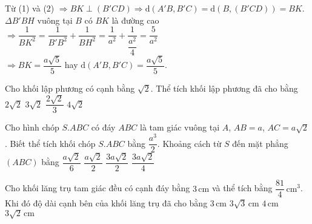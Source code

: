 \begin{ex}
{{}
			\noindent Từ (1) và (2) $\Rightarrow BK\perp \left( B'CD \right)\Rightarrow \mathrm{d} \left( A'B,B'C \right)=\mathrm{d} \left( B,\left( B'CD \right) \right)=BK$.\\
			$\Delta B'BH$ vuông tại $B$ có $BK$ là đường cao $\Rightarrow \dfrac{1}{BK^2}=\dfrac{1}{B'B^2}+\dfrac{1}{BH^2}=\dfrac{1}{a^2}+\dfrac{1}{\dfrac{a^2}{4}}=\dfrac{5}{a^2}$ \\ 
			$\Rightarrow BK=\dfrac{a\sqrt{5}}{5}$ hay $\mathrm{d} \left( A'B,B'C \right)=\dfrac{a\sqrt{5}}{5}$. 
		}
	\end{ex}
	
	\begin{ex}%
		Cho khối lập phương có cạnh bằng $\sqrt{2}$. Thể tích khối lập phương đã cho bằng
		\choice
		{\True $2\sqrt{2}$}
		{$3\sqrt{2}$}
		{$\dfrac{2\sqrt{2}}{3}$}
		{$4\sqrt{2}$}
	\end{ex}
	
	\begin{ex}%
		Cho hình chóp $S.ABC$ có đáy $ABC$ là tam giác vuông tại $A$, $AB=a$, $AC=a\sqrt{2}$. Biết thể tích khối chóp $S.ABC$ bằng $\dfrac{a^3}{2}$. Khoảng cách từ $S$ đến mặt phẳng $\left(ABC\right)$ bằng
		\choice
		{$\dfrac{a\sqrt{2}}{6}$}
		{$\dfrac{a\sqrt{2}}{2}$}
		{\True $\dfrac{3a\sqrt{2}}{2}$}
		{$\dfrac{3a\sqrt{2}}{4}$}
	\end{ex}
	
	\begin{ex}%
		Cho khối lăng trụ tam giác đều có cạnh đáy bằng $3\mathrm{\,cm}$ và thể tích bằng $\dfrac{81}{4}\mathrm{\,cm}^3$. Khi đó độ dài cạnh bên của khối lăng trụ đã cho bằng 
		\choice
		{$3 \mathrm{\,cm} $}
		{\True $3\sqrt 3 \mathrm{\,cm}$}
		{$4\mathrm{\,cm}$}
		{$3\sqrt 2 \mathrm{\,cm}$}
	\end{ex}
	

